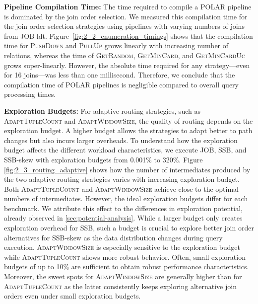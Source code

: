 \textbf{Pipeline Compilation Time:} The time required to compile a POLAR pipeline is dominated by the join order selection. We measured this compilation time for the join order selection strategies using pipelines with varying numbers of joins from JOB-ldt. Figure~\ref{fig:2_2_enumeration_timings} shows that the compilation time for \textsc{PushDown} and \textsc{PullUp} grows linearly with increasing number of relations, whereas the time of \textsc{GetRandom}, \textsc{GetMinCard}, and \textsc{GetMinCardUc} grows super-linearly. However, the absolute time required for any strategy---even for 16 joins---was less than one millisecond. Therefore, we conclude that the compilation time of POLAR pipelines is negligible compared to overall query processing times.

\textbf{Exploration Budgets:} For adaptive routing strategies, such as \textsc{AdaptTupleCount} and \textsc{AdaptWindowSize}, the quality of routing depends on the exploration budget. A higher budget allows the strategies to adapt better to path changes but also incurs larger overheads. To understand how the exploration budget affects the different workload characteristics, we execute JOB, SSB, and SSB-skew with exploration budgets from 0.001\% to 320\%. Figure \ref{fig:2_3_routing_adaptive} shows how the number of intermediates produced by the two adaptive routing strategies varies with increasing exploration budget. Both \textsc{AdaptTupleCount} and \textsc{AdaptWindowSize} achieve close to the optimal numbers of intermediates. However, the ideal exploration budgets differ for each benchmark. We attribute this effect to the differences in exploration potential, already observed in \ref{sec:potential-analysis}. While a larger budget only creates exploration overhead for SSB, such a budget is crucial to explore better join order alternatives for SSB-skew as the data distribution changes during query execution. \textsc{AdaptWindowSize} is especially sensitive to the exploration budget while \textsc{AdaptTupleCount} shows more robust behavior. Often, small exploration budgets of up to 10\% are sufficient to obtain robust performance characteristics. Moreover, the sweet spots for \textsc{AdaptWindowSize} are generally higher than for \textsc{AdaptTupleCount} as the latter consistently keeps exploring alternative join orders even under small exploration budgets.



